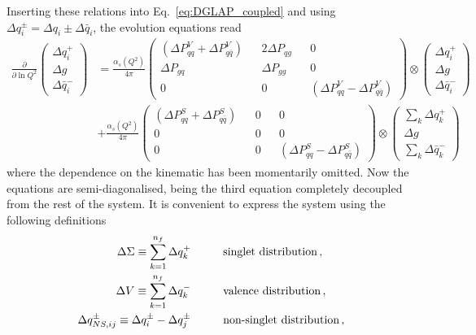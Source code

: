 Inserting these relations into Eq.~\eqref{eq:DGLAP_coupled} and using $\Delta q_{i}^{\pm} = \Delta q_{i} \pm \Delta \bar{q}_{i}$,
the evolution equations read 
\begin{equation}
  \begin{split}
    \frac{\partial}{\partial \ln Q^2} 
    \left(\begin{matrix}
      \Delta q_i^{+} \\
      \Delta g \\
      \Delta \bar{q}_i^{-}
    \end{matrix} \right) & = \frac{\alpha_{s}(Q^2)}{4 \pi} 
    \left(\begin{matrix}
      (\Delta P_{qq}^{V} + \Delta P_{q\bar{q}}^{V}) && 2 \Delta P_{qg} && 0 \\
      \Delta P_{gq} && \Delta P_{gg} && 0 \\
      0 && 0 && (\Delta P_{qq}^{V} - \Delta P_{q\bar{q}}^{V})
    \end{matrix} \right) \otimes
    \left(\begin{matrix}
      \Delta q_i^{+} \\
      \Delta g \\
      \Delta \bar{q}_i^{-}
    \end{matrix} \right) 
    \\[10pt]
    & + \frac{\alpha_{s}(Q^2)}{4 \pi}
    \left(\begin{matrix}
      (\Delta P_{qq}^{S} + \Delta P_{q \bar{q}}^{S}) && 0 && 0 \\
      0 && 0 && 0 \\
      0 && 0 && (\Delta P_{qq}^{S} - \Delta P_{q\bar{q}}^{S})
    \end{matrix} \right) 
    \otimes
    \left(\begin{matrix}
      \sum_{k} \Delta q_k^{+} \\
      \Delta g \\
      \sum_{k} \Delta \bar{q}_k^{-}
    \end{matrix} \right)
  \end{split}
\end{equation}
where the dependence on the kinematic has been momentarily omitted. Now the equations are semi-diagonalised, being the third equation completely decoupled from the rest of the system. It is convenient to express the system using the following definitions
\begin{equation}
  \begin{split}
     \Delta \Sigma \equiv \sum_{k=1}^{n_{f}} \Delta q_{k}^{+}  \hspace{10mm} & \T{singlet distribution}\, ,\\
     \Delta V \equiv \sum_{k=1}^{n_{f}} \Delta q_{k}^{-}  \hspace{10mm} & \T{valence distribution}\,, \\
     \Delta q_{NS,ij}^{\pm} \equiv \Delta q_{i}^{\pm} - \Delta q_{j}^{\pm} \hspace{10mm} & \T{non-singlet distribution} \,,
  \end{split}
  \label{eq:evb_dist}
\end{equation}
